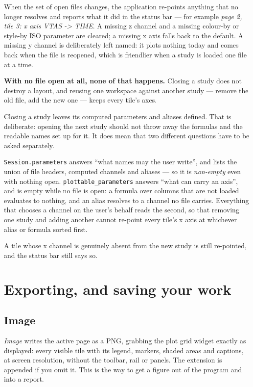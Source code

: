 \documentclass[11pt,a4paper,oneside]{report}
\newcommand{\code}[1]{\texttt{#1}}
\begin{document}
When the set of open files changes, the application re-points anything that no
longer resolves and reports what it did in the status bar --- for example
\emph{page 2, tile 3: x axis VTAS -> TIME}. A missing z channel and a missing
colour-by or style-by ISO parameter are cleared; a missing x axis falls back to
the default. A missing y channel is deliberately left named: it plots nothing
today and comes back when the file is reopened, which is friendlier when a study
is loaded one file at a time.

\textbf{With no file open at all, none of that happens.} Closing a study does
not destroy a layout, and reusing one workspace against another study --- remove
the old file, add the new one --- keeps every tile's axes.

Closing a study leaves its computed parameters and aliases defined. That is
deliberate: opening the next study should not throw away the formulas and the
readable names set up for it. It does mean that two different questions have to
be asked separately.

\code{Session.parameters} answers ``what names may the user write'', and lists
the union of file headers, computed channels and aliases --- so it is
\emph{non-empty} even with nothing open. \code{plottable\_parameters} answers
``what can carry an axis'', and is empty while no file is open: a formula over
columns that are not loaded evaluates to nothing, and an alias resolves to a
channel no file carries. Everything that chooses a channel on the user's behalf
reads the second, so that removing one study and adding another cannot re-point
every tile's x axis at whichever alias or formula sorted first.

A tile whose x channel is genuinely absent from the new study is still
re-pointed, and the status bar still says so.

\chapter{Exporting, and saving your work}

\section{Image}

\emph{Image} writes the active page as a PNG, grabbing the plot grid widget
exactly as displayed: every visible tile with its legend, markers, shaded areas
and captions, at screen resolution, without the toolbar, rail or panels. The
extension is appended if you omit it. This is the way to get a figure out of the
program and into a report.
\end{document}
